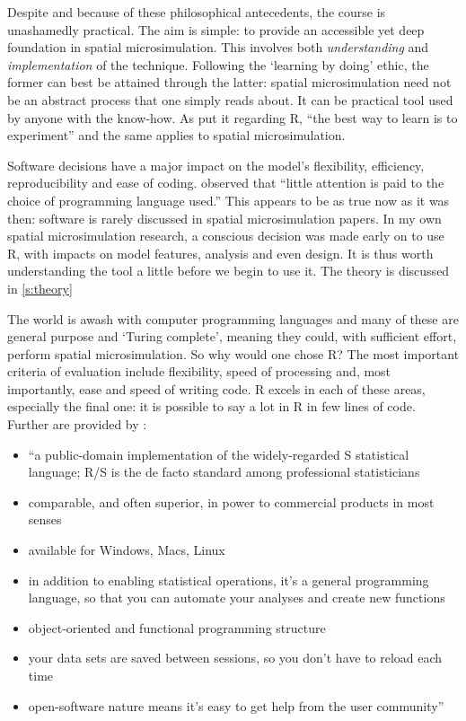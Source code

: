 \documentclass[a5paper, 11pt, twoside]{book}  %
\begin{document}
Despite and because of these philosophical antecedents, the course is
unashamedly practical. The aim is simple: to provide an accessible yet
deep foundation in spatial microsimulation. This involves both
\emph{understanding} and \emph{implementation} of the technique.
Following the `learning by doing' ethic, the former can best be
attained through the latter: spatial microsimulation need not be an abstract
process that one simply reads about. It can be practical tool used by anyone
with the know-how. As \citet[xxii]{kabacoff2011r} put it regarding R, ``the best
way to learn is to experiment'' and the same applies to spatial microsimulation.


Software decisions have a major impact on the model's flexibility, efficiency,
reproducibility and
ease of coding. \citet[p.~153]{Holm1987} observed that ``little attention is
paid to the choice of programming language used.''
This appears to be as true now as it was then: software is rarely discussed in
spatial microsimulation papers. 
In my own spatial microsimulation research, a conscious decision was made early
on to use R, with impacts on model features, analysis
and even design. It is thus worth understanding the tool a little before we
begin to use it. The theory is discussed in \cref{s:theory}

The world is awash with computer programming languages and many of these
are general purpose and `Turing complete', meaning they could, with sufficient
effort, perform spatial microsimulation. So why would one chose R?
The most important criteria of evaluation include flexibility,
speed of processing and, most importantly, ease and speed of writing code.
R excels in each of these areas, especially the final one: it
is possible to say a lot in R in few lines of code. Further
are provided by \citet{Matloff-R}:

\begin{itemize}
\item ``a public-domain implementation of the widely-regarded S statistical
language; R/S is the de facto standard among professional statisticians
\item comparable, and often superior, in power to commercial products in most
senses
\item available for Windows, Macs, Linux
\item in addition to enabling statistical operations, it's a general programming
language, so that you can
automate your analyses and create new functions
\item object-oriented and functional programming structure
\item your data sets are saved between sessions, so you don't have to reload
each time
\item open-software nature means it’s easy to get help from the user
community''
\end{itemize}
\end{document}
